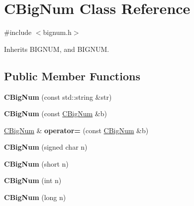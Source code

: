 \hypertarget{class_c_big_num}{}\section{C\+Big\+Num Class Reference}
\label{class_c_big_num}


{\ttfamily \#include $<$bignum.\+h$>$}



Inherits B\+I\+G\+N\+UM, and B\+I\+G\+N\+UM.

\subsection*{Public Member Functions}
\begin{DoxyCompactItemize}
\item 
\mbox{\label{class_c_big_num_a250bd7117bd7fa99bbd53f496f76058e}} 
{\bfseries C\+Big\+Num} (const std\+::string \&str)
\item 
\mbox{\label{class_c_big_num_a50fcecb7d672c2b7d0a89e641a0682ca}} 
{\bfseries C\+Big\+Num} (const \mbox{\hyperlink{class_c_big_num}{C\+Big\+Num}} \&b)
\item 
\mbox{\label{class_c_big_num_a575e705d2120b0a43d74d798eaef48ee}} 
\mbox{\hyperlink{class_c_big_num}{C\+Big\+Num}} \& {\bfseries operator=} (const \mbox{\hyperlink{class_c_big_num}{C\+Big\+Num}} \&b)
\item 
\mbox{\label{class_c_big_num_a318644830d41471cd2bbcd702975bbb1}} 
{\bfseries C\+Big\+Num} (signed char n)
\item 
\mbox{\label{class_c_big_num_a0f4e34dcc48e9089e9f20c06418755c9}} 
{\bfseries C\+Big\+Num} (short n)
\item 
\mbox{\label{class_c_big_num_a930e53591ce24f650f7ddd1076bd4efe}} 
{\bfseries C\+Big\+Num} (int n)
\item 
\mbox{\label{class_c_big_num_a96ef554f3153f676125a49889303cf31}} 
{\bfseries C\+Big\+Num} (long n)
\item 
\mbox{\label{class_c_big_num_afe63a4eb433e69687fad44193390dc1b}} 

\end{DoxyCompactItemize}
